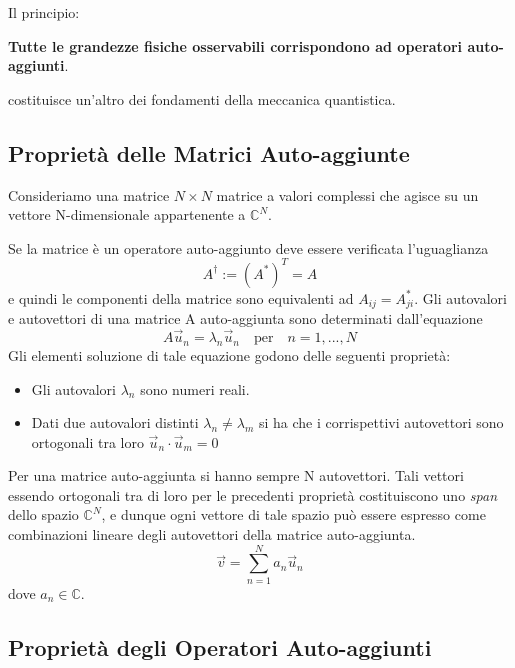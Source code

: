 \noindent Il principio: 
\begin{center}
\textbf{Tutte le grandezze fisiche osservabili corrispondono ad operatori auto-aggiunti}.	
\end{center}
costituisce un'altro dei fondamenti della meccanica quantistica.
 
\subsection{Propriet\`a delle Matrici Auto-aggiunte}

Consideriamo una matrice $N \times N$ matrice a valori complessi che agisce su un vettore N-dimensionale appartenente a $\mathbb{C}^N$. 

Se la matrice \`e un operatore auto-aggiunto deve essere verificata l'uguaglianza
\begin{equation*}
	A^\dag := (A^*)^T =A
\end{equation*}
e quindi le componenti della matrice sono equivalenti ad $A_{ij} = A^*_{ji} $. Gli autovalori e autovettori di una matrice A auto-aggiunta sono determinati dall'equazione 
\begin{equation*}
	A \vec{u}_n = \lambda_n \vec{u}_n \quad \text{per} \quad n = 1,...,N
\end{equation*}
Gli elementi soluzione di tale equazione godono delle seguenti propriet\`a: 
\begin{itemize}
	\item Gli autovalori $\lambda_n$ sono numeri reali.
	\item Dati due autovalori distinti $\lambda_n \neq \lambda_m$ si ha che i corrispettivi autovettori sono ortogonali tra loro $\vec{u}_n \cdot \vec{u}_m = 0$
\end{itemize}

Per una matrice auto-aggiunta si hanno sempre N autovettori. Tali vettori essendo ortogonali tra di loro per le precedenti propriet\`a costituiscono uno \textit{span} dello spazio $\mathbb{C}^N$, e dunque ogni vettore di tale spazio pu\`o essere espresso come combinazioni lineare degli autovettori della matrice auto-aggiunta.
\begin{equation}
	\vec{v} = \sum_{n=1}^N a_n \vec{u}_n
\end{equation}
dove $a_n \in \mathbb{C}$.

\subsection{Propriet\`a degli Operatori Auto-aggiunti}


